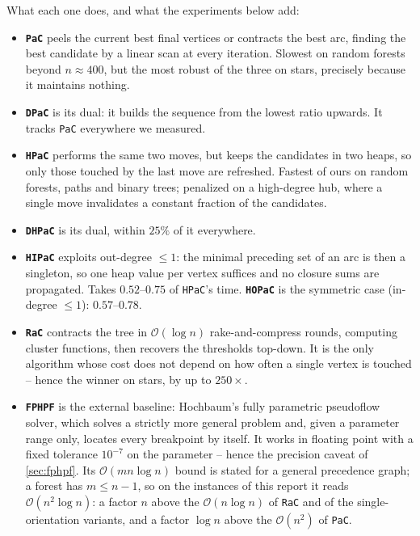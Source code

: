 \documentclass[11pt]{article}
\begin{document}
\noindent
What each one does, and what the experiments below add:

\begin{itemize}
  \item \textbf{\texttt{PaC}} peels the current best final vertices or
  contracts the best arc, finding the best candidate by a linear scan at every
  iteration. Slowest on random forests beyond $n\approx400$, but the most
  robust of the three on stars, precisely because it maintains nothing.
  \item \textbf{\texttt{DPaC}} is its dual: it builds the sequence from the
  lowest ratio upwards. It tracks \texttt{PaC} everywhere we measured.
  \item \textbf{\texttt{HPaC}} performs the same two moves, but keeps the
  candidates in two heaps, so only those touched by the last move are
  refreshed. Fastest of ours on random forests, paths and binary trees;
  penalized on a high-degree hub, where a single move invalidates a constant
  fraction of the candidates.
  \item \textbf{\texttt{DHPaC}} is its dual, within $25\%$ of it everywhere.
  \item \textbf{\texttt{HIPaC}} exploits out-degree $\le1$: the minimal
  preceding set of an arc is then a singleton, so one heap value per vertex
  suffices and no closure sums are propagated. Takes $0.52$--$0.75$ of
  \texttt{HPaC}'s time. \textbf{\texttt{HOPaC}} is the symmetric case
  (in-degree $\le1$): $0.57$--$0.78$.
  \item \textbf{\texttt{RaC}} contracts the tree in $\mathcal O(\log n)$
  rake-and-compress rounds, computing cluster functions, then recovers the
  thresholds top-down. It is the only algorithm whose cost does not depend on
  how often a single vertex is touched -- hence the winner on stars, by up to
  $250\times$.
  \item \textbf{\texttt{FPHPF}} is the external baseline: Hochbaum's fully
  parametric pseudoflow solver, which solves a strictly more general problem
  and, given a parameter range only, locates every breakpoint by itself. It
  works in floating point with a fixed tolerance $10^{-7}$ on the parameter --
  hence the precision caveat of \cref{sec:fphpf}. Its $\mathcal O(mn\log n)$
  bound is stated for a general precedence graph; a forest has $m\le n-1$, so
  on the instances of this report it reads $\mathcal O(n^2\log n)$: a factor
  $n$ above the $\mathcal O(n\log n)$ of \texttt{RaC} and of the
  single-orientation variants, and a factor $\log n$ above the
  $\mathcal O(n^2)$ of \texttt{PaC}.
\end{itemize}
\end{document}
